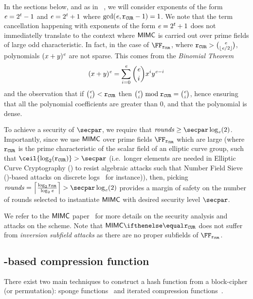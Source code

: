 In the sections below, and as in ~\cite{albrecht2016mimc}, we will consider exponents of the form $\mathit{e}{} = 2^t-1$ and $\mathit{e}{} = 2^t+1$ where $\gcd(\mathit{e}{}, \mathtt{r_{CUR}}-1) = 1$. We note that the term cancellation happening with exponents of the form $\mathit{e}{} = 2^t+1$ does not immediatelly translate to the context where $\mathsf{MIMC{}}$ is carried out over prime fields of large odd characteristic. In fact, in the case of $\FFx{\rCURVE}$, where $\mathtt{r_{CUR}} > \binom{\mathit{e}}{\lfloor \mathit{e} / 2 \rfloor}$, polynomials $(x + y)^{\mathit{e}}$ are not sparse.
This comes from the \emph{Binomial Theorem}
\[
  (x + y)^{\mathit{e}} = \sum_{i = 0}^{\mathit{e}} \binom{\mathit{e}}{i} x^{i}y^{\mathit{e} - i}
\]
and the observation that if $\binom{\mathit{e}}{i} < \mathtt{r_{CUR}}$ then $\binom{\mathit{e}}{i} \bmod \mathtt{r_{CUR}} = \binom{\mathit{e}}{i}$, hence ensuring that all the polynomial coefficients are greater than $0$, and that the polynomial is dense.

To achieve a security of $\secpar$, we require that $\rounds \geq \secpar \log_{\exponent}(2)$.
Importantly, since we use $\mathsf{MIMC{}}$ over prime fields $\FFx{\rCURVE}$ which are large (where $\mathtt{r_{CUR}}$ is the prime characteristic of the scalar field of an elliptic curve group, such that $\ceil{\log_2(\rCURVE)} > \secpar$ (i.e.~longer elements are needed in Elliptic Curve Cryptography (\ecc) to resist algebraic attacks such that Number Field Sieve (\acrnfs)-based attacks on discrete logs~\cite{DBLP:journals/siamdm/Gordon93} for instance)), then, picking $\rounds = \left\lceil \frac{\log_2 \rCURVE}{\log_2 \exponent{}} \right\rceil > \secpar \log_{\exponent}(2)$ provides a margin of safety on the number of rounds selected to instantiate $\mathsf{MIMC{}}$ with desired security level $\secpar$.

We refer to the $\mathsf{MIMC{}}$ paper~\cite[Section 4.2 and 5.1]{albrecht2016mimc} for more details on the security analysis and attacks on the scheme. Note that $\mimcPrime{\rCURVE}$ does not suffer from \emph{inversion subfield attacks} as there are no proper subfields of $\FFx{\rCURVE}$.

\subsection{\mimc{}-based compression function}\label{instantiation:mkhash:mimc-compressionf}

There exist two main techniques to construct a hash function from a block-cipher (or permutation): sponge functions~\cite{bertoni2007sponge} and iterated compression functions~\cite{black2002black}.

